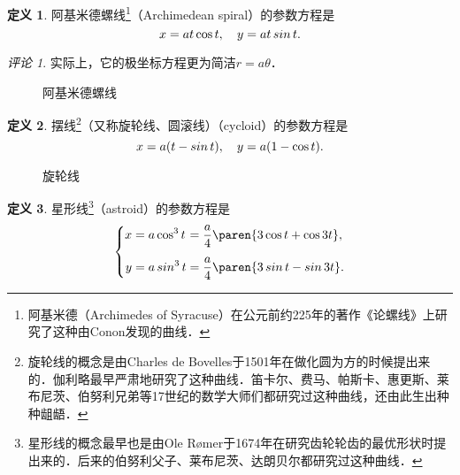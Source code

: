 \documentclass[a4paper,punct=CCT]{ctexbook}
\theoremstyle{definition}
\newtheorem*{definition*}{定义}
\theoremstyle{remark}
\newtheorem*{remark}{评论}
\begin{document}
\begin{definition*}
  阿基米德螺线\footnote{阿基米德（Archimedes of Syracuse）在公元前约225年的著作《论螺线》上研究了这种由Conon发现的曲线．}（Archimedean spiral）的参数方程是
  \[
    \setlength{\abovedisplayskip}{.8ex}
    \setlength{\belowdisplayskip}{.8ex}
    x = at \cos t, \quad y = at \sin t.
  \]

  \begin{remark}
    实际上，它的极坐标方程更为简洁\(r = a \theta\)．
  \end{remark}
\end{definition*}

\begin{figure}[H]
  \centering
  \caption*{阿基米德螺线}
\end{figure}

\begin{definition*}
  摆线\footnote{旋轮线的概念是由Charles de Bovelles于1501年在做化圆为方的时候提出来的．伽利略最早严肃地研究了这种曲线．笛卡尔、费马、帕斯卡、惠更斯、莱布尼茨、伯努利兄弟等17世纪的数学大师们都研究过这种曲线，还由此生出种种龃龉．}（又称旋轮线、圆滚线）（cycloid）的参数方程是
  \[
    \setlength{\abovedisplayskip}{.8ex}
    x = a (t - \sin t), \quad y = a (1 - \cos t).
  \]
\end{definition*}

\begin{figure}[H]
  \centering
  \caption*{旋轮线}
\end{figure}

\begin{definition*}
  星形线\footnote{星形线的概念最早也是由Ole Rømer于1674年在研究齿轮轮齿的最优形状时提出来的．后来的伯努利父子、莱布尼茨、达朗贝尔都研究过这种曲线．}（astroid）的参数方程是
  \[
    \left\{
      \addtolength{\jot}{1ex}
      \begin{alignedat}{2}
        x &= a \cos^3 t &&= \frac a4 \paren{3 \cos t + \cos 3t}, \\
        y &= a \sin^3 t &&= \frac a4 \paren{3 \sin t - \sin 3t}.
      \end{alignedat}
    \right.
  \]
\end{definition*}
\end{document}
